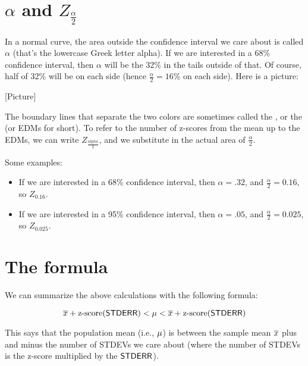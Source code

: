 \documentclass[../../../main.tex]{subfiles}
\begin{document}
\section{$\alpha$ and $Z_{\frac{\alpha}{2}}$}

In a normal curve, the area outside the confidence interval we care about is called $\alpha$ (that's the lowercase Greek letter alpha). If we are interested in a 68\% confidence interval, then $\alpha$ will be the 32\% in the tails outside of that. Of course, half of 32\% will be on each side (hence $\frac{\alpha}{2} = 16\%$ on each side). Here is a picture:

    [Picture]

\noindent
The boundary lines that separate the two colors are sometimes called the , or the  (or EDMs for short). To refer to the number of z-scores from the mean up to the EDMs, we can write $Z_{\frac{alpha}{2}}$, and we substitute in the actual area of $\frac{\alpha}{2}$. 

Some examples:

\begin{itemize}
  \item If we are interested in a 68\% confidence interval, then $\alpha = .32$, and $\frac{\alpha}{2} = 0.16$, so $Z_{0.16}$.
  \item If we are interested in a 95\% confidence interval, then $\alpha = .05$, and $\frac{\alpha}{2} = 0.025$, so $Z_{0.025}$.
\end{itemize}


\section{The formula}

We can summarize the above calculations with the following formula:

\begin{equation*}
  \samplemean{x} + \text{z-score}(\StdErr/) < \populationmean < \samplemean{x} + \text{z-score}(\StdErr/)
\end{equation*}

\noindent
This says that the population mean (i.e., $\mu$) is between the sample mean $\overline{x}$ plus and minus the number of STDEVs we care about (where the number of STDEVs is the z-score multiplied by the $\StdErr/$).
\end{document}
